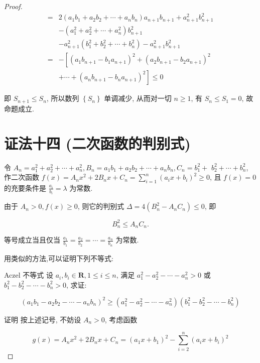 \begin{proof}
	$$
	\begin{aligned}
	= & 2\left(a_{1} b_{1}+a_{2} b_{2}+\cdots+a_{n} b_{n}\right) a_{n+1} b_{n+1}+a_{n+1}^{2} b_{n+1}^{2} \\
	& -\left(a_{1}^{2}+a_{2}^{2}+\cdots+a_{n}^{2}\right) b_{n+1}^{2} \\
	& -a_{n+1}^{2}\left(b_{1}^{2}+b_{2}^{2}+\cdots+b_{n}^{2}\right)-a_{n+1}^{2} b_{n+1}^{2} \\
	= & -\left[\left(a_{1} b_{n+1}-b_{1} a_{n+1}\right)^{2}+\left(a_{2} b_{n+1}-b_{2} a_{n+1}\right)^{2}\right. \\
	& \left.+\cdots+\left(a_{n} b_{n+1}-b_{n} a_{n+1}\right)^{2}\right] \leqslant 0
	\end{aligned}
	$$
	
	即 $S_{n+1} \leqslant S_{n}$, 所以数列 $\left\{S_{n}\right\}$ 单调减少, 从而对一切 $n \geqslant 1$, 有 $S_{n} \leqslant S_{1}=0$, 故命题成立.
	
	\section*{证法十四 (二次函数的判别式)}
	令 $A_{n}=a_{1}^{2}+a_{2}^{2}+\cdots+a_{n}^{2}, B_{n}=a_{1} b_{1}+a_{2} b_{2}+\cdots+a_{n} b_{n}, C_{n}=b_{1}^{2}+$ $b_{2}^{2}+\cdots+b_{n}^{2}$, 作二次函数 $f(x)=A_{n} x^{2}+2 B_{n} x+C_{n}=\sum_{i=1}^{n}\left(a_{i} x+b_{i}\right)^{2} \geqslant 0$, 且 $f(x)=0$ 的充要条件是 $\frac{a_{i}}{b_{i}}=\lambda$ 为常数.
	
	由于 $A_{n}>0, f(x) \geqslant 0$, 则它的判别式 $\Delta=4\left(B_{n}^{2}-A_{n} C_{n}\right) \leqslant 0$, 即
	
	$$
	B_{n}^{2} \leqslant A_{n} C_{n} .
	$$
	
	等号成立当且仅当 $\frac{a_{1}}{b_{1}}=\frac{a_{2}}{b_{2}}=\cdots=\frac{a_{n}}{b_{n}}$ 为常数.
	
	用类似的方法,可以证明下列不等式:
	
	Aczel 不等式 设 $a_{i}, b_{i} \in \mathbf{R}, 1 \leqslant i \leqslant n$, 满足 $a_{1}^{2}-a_{2}^{2}-\cdots-a_{n}^{2}>0$ 或 $b_{1}^{2}-b_{2}^{2}-\cdots-b_{n}^{2}>0$, 求证:
	
	$$
	\left(a_{1} b_{1}-a_{2} b_{2}-\cdots-a_{n} b_{n}\right)^{2} \geqslant\left(a_{1}^{2}-a_{2}^{2}-\cdots-a_{n}^{2}\right)\left(b_{1}^{2}-b_{2}^{2}-\cdots-b_{n}^{2}\right)
	$$
	
	证明 按上述记号, 不妨设 $A_{n}>0$, 考虑函数
	
	$$
	g(x)=A_{n} x^{2}+2 B_{n} x+C_{n}=\left(a_{1} x+b_{1}\right)^{2}-\sum_{i=2}^{n}\left(a_{i} x+b_{i}\right)^{2}
	$$
	

\end{proof}
